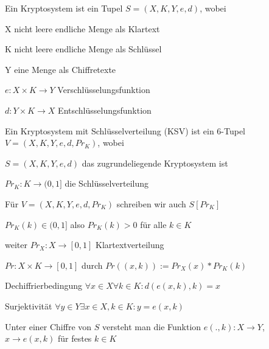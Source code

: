 \documentclass[avery5371, frame]{flashcards}
\begin{document}

\begin{flashcard}[Kryptosysteme]{Ein Kryptosystem ist ein Tupel $S=(X,K,Y,e,d)$, wobei}
    \begin{itemize*}
        \item X nicht leere endliche Menge als Klartext
        \item K nicht leere endliche Menge als Schlüssel
        \item Y eine Menge als Chiffretexte
        \item $e:X\times K\rightarrow Y$ Verschlüsselungsfunktion
        \item $d:Y\times K\rightarrow X$ Entschlüsselungsfunktion
    \end{itemize*}
\end{flashcard}

\begin{flashcard}{Ein Kryptosystem mit Schlüsselverteilung (KSV) ist ein 6-Tupel $V=(X,K,Y,e,d,Pr_K)$, wobei}
    \begin{itemize*}
        \item $S=(X,K,Y,e,d)$ das zugrundeliegende Kryptosystem ist
        \item $Pr_K:K\rightarrow (0,1]$ die Schlüsselverteilung
        \item Für $V=(X,K,Y,e,d,Pr_K)$ schreiben wir auch $S[Pr_K]$
        \item $Pr_K(k)\in (0,1]$ also $Pr_K(k)> 0$ für alle $k\in K$
        \item weiter $Pr_X:X\rightarrow [0,1]$ Klartextverteilung
        \item $Pr:X\times K\rightarrow [0,1]$ durch $Pr((x,k)):=Pr_X(x)*Pr_K(k)$
    \end{itemize*}
\end{flashcard}

\begin{flashcard}[Kryptosysteme]{Dechiffrierbedingung}
    $\forall x\in X\forall k\in K:d(e(x,k),k) =x$
\end{flashcard}

\begin{flashcard}[Kryptosysteme]{Surjektivität}
    $\forall y\in Y\exists x\in X,k\in K:y=e(x,k)$
\end{flashcard}

\begin{flashcard}[Kryptosysteme]{Unter einer Chiffre von $S$ versteht man}
    die Funktion $e(.,k):X\rightarrow Y$, $x\rightarrow e(x,k)$ für festes $k\in K$
\end{flashcard}
\end{document}
